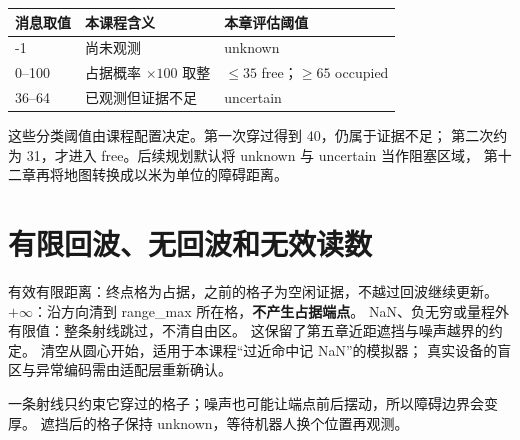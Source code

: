 \begin{center}
\begin{tabular}{lll}
\toprule
消息取值 & 本课程含义 & 本章评估阈值\\\midrule
-1 & 尚未观测 & unknown\\
0--100 & 占据概率 $\times100$ 取整 & $\le35$ free；$\ge65$ occupied\\
36--64 & 已观测但证据不足 & uncertain\\
\bottomrule
\end{tabular}
\end{center}
这些分类阈值由课程配置决定。第一次穿过得到 40，仍属于证据不足；
第二次约为 31，才进入 free。后续规划默认将 unknown 与 uncertain 当作阻塞区域，
第十二章再将地图转换成以米为单位的障碍距离。

\section{有限回波、无回波和无效读数}
\begin{center}
\end{center}

\par\noindent\begin{minipage}{\linewidth}

\end{minipage}\par

有效有限距离：终点格为占据，之前的格子为空闲证据，不越过回波继续更新。
$+\infty$：沿方向清到 range\_max 所在格，\textbf{不产生占据端点}。
NaN、负无穷或量程外有限值：整条射线跳过，不清自由区。
这保留了第五章近距遮挡与噪声越界的约定。
清空从圆心开始，适用于本课程“过近命中记 NaN”的模拟器；
真实设备的盲区与异常编码需由适配层重新确认。

一条射线只约束它穿过的格子；噪声也可能让端点前后摆动，所以障碍边界会变厚。
遮挡后的格子保持 unknown，等待机器人换个位置再观测。

